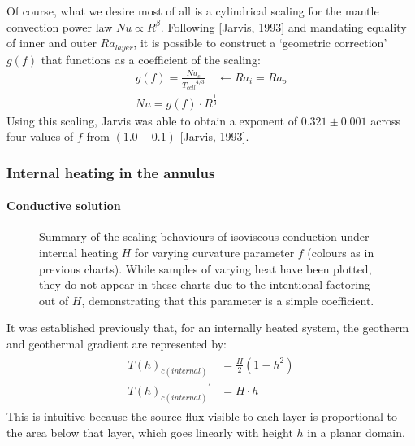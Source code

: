 \documentclass[letterpaper,10pt,english]{jupyterBook}
\begin{document}
\sphinxAtStartPar
Of course, what we desire most of all is a cylindrical scaling for the mantle convection power law \(Nu \propto R^{\beta}\). Following {[}\hyperlink{cite.references:id442}{Jarvis, 1993}{]} and mandating equality of inner and outer \(Ra_{layer}\), it is possible to construct a ‘geometric correction’ \(g(f)\) that functions as a coefficient of the  scaling:
\begin{equation*}
\begin{split}
g(f) = \frac{Nu_{c}}{{T_{cell}}^{4/3}} \quad \leftarrow Ra_i = Ra_o \\
Nu = g(f) \cdot R^{\frac{1}{3}}
\end{split}
\end{equation*}
\sphinxAtStartPar
Using this scaling, Jarvis was able to obtain a  exponent of \(0.321 \pm 0.001\) across four values of \(f\) from \((1.0 - 0.1)\) {[}\hyperlink{cite.references:id442}{Jarvis, 1993}{]}.


\subsubsection{Internal heating in the annulus}
\label{\detokenize{content/chapter_04_isoviscous/background/cylindrical:internal-heating-in-the-annulus}}

\paragraph{Conductive solution}
\label{\detokenize{content/chapter_04_isoviscous/background/cylindrical:id8}}
\begin{figure}[htbp]
\centering
\capstart

\noindent{}
\caption{Summary of the scaling behaviours of isoviscous conduction under internal heating \(H\) for varying curvature parameter \(f\) (colours as in previous charts). While samples of varying heat have been plotted, they do not appear in these charts due to the intentional factoring out of \(H\), demonstrating that this parameter is a simple coefficient.}\label{\detokenize{content/chapter_04_isoviscous/background/cylindrical:isocondinternal}}\end{figure}

\sphinxAtStartPar
It was established previously that, for an internally heated system, the geotherm and geothermal gradient are represented by:
\begin{equation*}
\begin{split} \begin{align*}
{T(h)}_{c(internal)} &= \frac{H}{2} \left( 1 - h^2 \right) \\
{{T(h)}_{c(internal)}}^{'} &= H\cdot h
\end{align*} \end{split}
\end{equation*}
\sphinxAtStartPar
This is intuitive because the source flux visible to each layer is proportional to the area below that layer, which goes linearly with height \(h\) in a planar domain.
\end{document}
